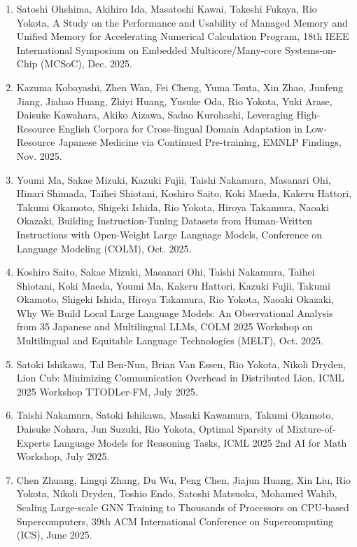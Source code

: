 \documentclass[margin,line]{cv}
\begin{document}
\begin{resume}
\begin{enumerate}
\item Satoshi Ohshima, Akihiro Ida, Masatoshi Kawai, Takeshi Fukaya, Rio Yokota, A Study on the Performance and Usability of Managed Memory and Unified Memory for Accelerating Numerical Calculation Program, 18th IEEE International Symposium on Embedded Multicore/Many-core Systems-on-Chip (MCSoC), Dec. 2025.

\item Kazuma Kobayashi, Zhen Wan, Fei Cheng, Yuma Tsuta, Xin Zhao, Junfeng Jiang, Jiahao Huang, Zhiyi Huang, Yusuke Oda, Rio Yokota, Yuki Arase, Daisuke Kawahara, Akiko Aizawa, Sadao Kurohashi, Leveraging High-Resource English Corpora for Cross-lingual Domain Adaptation in Low-Resource Japanese Medicine via Continued Pre-training, EMNLP Findings, Nov. 2025.

\item Youmi Ma, Sakae Mizuki, Kazuki Fujii, Taishi Nakamura, Masanari Ohi, Hinari Shimada, Taihei Shiotani, Koshiro Saito, Koki Maeda, Kakeru Hattori, Takumi Okamoto, Shigeki Ishida, Rio Yokota, Hiroya Takamura, Naoaki Okazaki, Building Instruction-Tuning Datasets from Human-Written Instructions with Open-Weight Large Language Models, Conference on Language Modeling (COLM), Oct. 2025.

\item Koshiro Saito, Sakae Mizuki, Masanari Ohi, Taishi Nakamura, Taihei Shiotani, Koki Maeda, Youmi Ma, Kakeru Hattori, Kazuki Fujii, Takumi Okamoto, Shigeki Ishida, Hiroya Takamura, Rio Yokota, Naoaki Okazaki, Why We Build Local Large Language Models: An Observational Analysis from 35 Japanese and Multilingual LLMs, COLM 2025 Workshop on Multilingual and Equitable Language Technologies (MELT), Oct. 2025.

\item Satoki Ishikawa, Tal Ben-Nun, Brian Van Essen, Rio Yokota, Nikoli Dryden, Lion Cub: Minimizing Communication Overhead in Distributed Lion, ICML 2025 Workshop TTODLer-FM, July 2025.

\item Taishi Nakamura, Satoki Ishikawa, Masaki Kawamura, Takumi Okamoto, Daisuke Nohara, Jun Suzuki, Rio Yokota, Optimal Sparsity of Mixture-of-Experts Language Models for Reasoning Tasks, ICML 2025 2nd AI for Math Workshop, July 2025.

\item Chen Zhuang, Lingqi Zhang, Du Wu, Peng Chen, Jiajun Huang, Xin Liu, Rio Yokota, Nikoli Dryden, Toshio Endo, Satoshi Matsuoka, Mohamed Wahib, Scaling Large-scale GNN Training to Thousands of Processors on CPU-based Supercomputers, 39th ACM International Conference on Supercomputing (ICS), June 2025.


\end{enumerate}
\end{resume}
\end{document}
